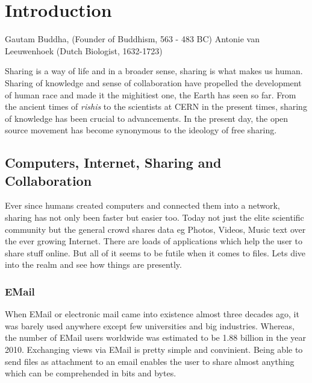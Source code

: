\chapter{Introduction}
\begin{epigraphs}
%
      {Gautam Buddha, (Founder of Buddhism, 563 - 483 BC)}
%
      {Antonie van Leeuwenhoek (Dutch Biologist, 1632-1723)}
\end{epigraphs}
Sharing is a way of life and in a broader sense, sharing is what makes us human. Sharing of knowledge and sense of collaboration have propelled the development of human race and made it the mighitiest one, the Earth has seen so far. From the ancient times of \emph{rishis} to the scientists at CERN in the present times, sharing of knowledge has been crucial to advancements. In the present day, the open source movement has become synonymous to the ideology of free sharing. \par
\section{Computers, Internet, Sharing and Collaboration}
Ever since humans created computers and connected them into a network, sharing has not only been faster but easier too. Today not just the elite scientific community but the general crowd shares data eg Photos, Videos, Music text over the ever growing Internet. There are loads of applications which help the user to share stuff online. But all of it seems to be futile when it comes to files.  Lets dive into the realm and see how things are presently. \par

\subsection{EMail}
When EMail or electronic mail came into existence almost three decades ago, it was barely used anywhere except few universities and big industries. Whereas, the number of EMail users worldwide was estimated to be 1.88 billion in the year 2010. Exchanging views via EMail is pretty simple and convinient. Being able to send files as attachment to an email enables the user to share almost anything which can be comprehended in bits and bytes.\par

